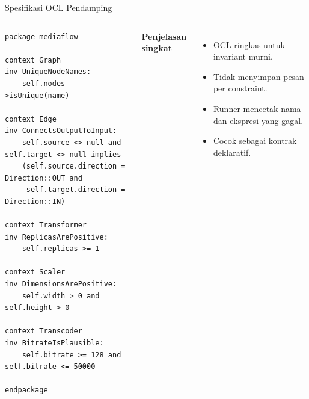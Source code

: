 \documentclass[aspectratio=169, table]{beamer}
\begin{document}
\begin{frame}[fragile]{Spesifikasi OCL Pendamping}
\vspace{24pt}
\begin{columns}[T,onlytextwidth]
\begin{lstlisting}[style=ocl, basicstyle=\ttfamily\tiny]
package mediaflow

context Graph
inv UniqueNodeNames:
    self.nodes->isUnique(name)

context Edge
inv ConnectsOutputToInput:
    self.source <> null and self.target <> null implies
    (self.source.direction = Direction::OUT and
     self.target.direction = Direction::IN)

context Transformer
inv ReplicasArePositive:
    self.replicas >= 1

context Scaler
inv DimensionsArePositive:
    self.width > 0 and self.height > 0

context Transcoder
inv BitrateIsPlausible:
    self.bitrate >= 128 and self.bitrate <= 50000

endpackage
\end{lstlisting}

\scriptsize
\textbf{Penjelasan singkat}
\begin{itemize}
  \item OCL ringkas untuk invariant murni.
  \item Tidak menyimpan pesan per constraint.
  \item Runner mencetak nama dan ekspresi yang gagal.
  \item Cocok sebagai kontrak deklaratif.
\end{itemize}
\end{columns}
\end{frame}
\end{document}
